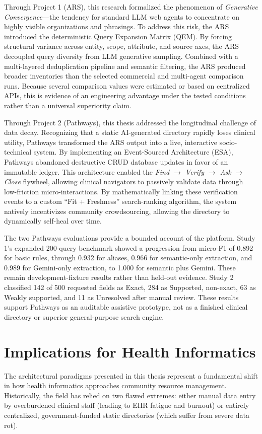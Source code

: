 \documentclass[12pt,oneside]{report}
\begin{document}
Through Project 1 (ARS), this research formalized the phenomenon of \textit{Generative Convergence}—the tendency for standard LLM web agents to concentrate on highly visible organizations and phrasings. To address this risk, the ARS introduced the deterministic Query Expansion Matrix (QEM). By forcing structural variance across entity, scope, attribute, and source axes, the ARS decoupled query diversity from LLM generative sampling. Combined with a multi-layered deduplication pipeline and semantic filtering, the ARS produced broader inventories than the selected commercial and multi-agent comparison runs. Because several comparison values were estimated or based on centralized APIs, this is evidence of an engineering advantage under the tested conditions rather than a universal superiority claim.

Through Project 2 (Pathways), this thesis addressed the longitudinal challenge of data decay. Recognizing that a static AI-generated directory rapidly loses clinical utility, Pathways transformed the ARS output into a live, interactive socio-technical system. By implementing an Event-Sourced Architecture (ESA), Pathways abandoned destructive CRUD database updates in favor of an immutable ledger. This architecture enabled the \textit{Find $\rightarrow$ Verify $\rightarrow$ Ask $\rightarrow$ Close} flywheel, allowing clinical navigators to passively validate data through low-friction micro-interactions. By mathematically linking these verification events to a custom ``Fit + Freshness'' search-ranking algorithm, the system natively incentivizes community crowdsourcing, allowing the directory to dynamically self-heal over time.

The two Pathways evaluations provide a bounded account of the platform. Study 1's expanded 200-query benchmark showed a progression from micro-F1 of 0.892 for basic rules, through 0.932 for aliases, 0.966 for semantic-only extraction, and 0.989 for Gemini-only extraction, to 1.000 for semantic plus Gemini. These remain development-fixture results rather than held-out evidence. Study 2 classified 142 of 500 requested fields as Exact, 284 as Supported, non-exact, 63 as Weakly supported, and 11 as Unresolved after manual review. These results support Pathways as an auditable assistive prototype, not as a finished clinical directory or superior general-purpose search engine.

\section{Implications for Health Informatics}
The architectural paradigms presented in this thesis represent a fundamental shift in how health informatics approaches community resource management. Historically, the field has relied on two flawed extremes: either manual data entry by overburdened clinical staff (leading to EHR fatigue and burnout) or entirely centralized, government-funded static directories (which suffer from severe data rot). 
\end{document}
